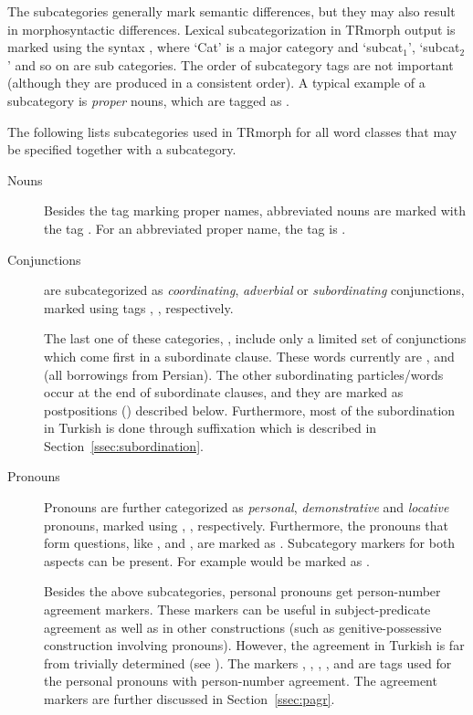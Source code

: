 \documentclass[twocolumn]{article}
\begin{document}
The subcategories generally mark semantic differences, but they may
also result in morphosyntactic differences. Lexical subcategorization
in TRmorph output is marked using the syntax
, where `Cat' is a major
category and `subcat$_1$', `subcat$_2$' and so on are sub categories.
The order of subcategory tags are not important (although they are
produced in a consistent order).  A typical example of a subcategory is
\emph{proper} nouns, which are tagged as . 

The following lists subcategories used in TRmorph for all word classes
that may be specified together with a subcategory.

\begin{description}

\item[Nouns] Besides the tag  marking proper names,
abbreviated nouns are marked with the tag . For an
abbreviated proper name, the tag is . 

\item[Conjunctions] are subcategorized as
\emph{coordinating}, \emph{adverbial} or \emph{subordinating} 
conjunctions, marked using tags , ,
 respectively. 

The last one of these categories, , include only a
limited set of conjunctions which come first in a subordinate clause.
These words currently are ,  and  (all
borrowings from Persian). The other subordinating particles/words occur
at the end of subordinate clauses, and they are marked as
postpositions () described below.  Furthermore, most
of the subordination in Turkish is done through suffixation which
is described in Section~\ref{ssec:subordination}.

\item[Pronouns] Pronouns are further categorized as \emph{personal},
\emph{demonstrative} and \emph{locative} pronouns, marked using
, ,  
respectively. Furthermore, the pronouns that form
questions, like , and , are
marked as . Subcategory
markers for both aspects can be present. For example  would be marked
as .

Besides the above subcategories, personal pronouns get person-number 
agreement markers. These markers can be useful in subject-predicate
agreement as well as in other constructions (such as
genitive-possessive construction involving pronouns). However, the
agreement in Turkish is far from trivially determined (see
\cite[pp.116--122]{goksel2005}). The markers 
,
,
,
,
 and
 are tags used for the personal pronouns with 
person-number agreement. The agreement markers are further
discussed in Section~\ref{ssec:pagr}. 


\end{description}
\end{document}
